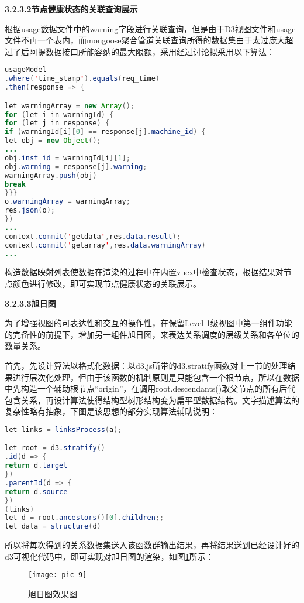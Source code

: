 {\textbf{3.2.3.2\quad 节点健康状态的关联查询展示}}

根据usage数据文件中的warning字段进行关联查询，但是由于D3视图文件和usage文件不再一个表内，而mongoose聚合管道关联查询所得的数据集由于太过庞大超过了后阿提数据接口所能容纳的最大限额，采用经过讨论拟采用以下算法：

\begin{lstlisting}[caption=基于vuex对数据的集中式管理,frame=shadowbox,language={java}]
usageModel
.where('time_stamp').equals(req_time)
.then(response => {

let warningArray = new Array();
for (let i in warningId) {
for (let j in response) {
if (warningId[i][0] == response[j].machine_id) {
let obj = new Object();
...
obj.inst_id = warningId[i][1];
obj.warning = response[j].warning;
warningArray.push(obj)
break
}}}
o.warningArray = warningArray;
res.json(o);
})
...
context.commit('getdata',res.data.result);
context.commit('getarray',res.data.warningArray)
...
\end{lstlisting}

构造数据映射列表使数据在渲染的过程中在内置vuex中检查状态，根据结果对节点颜色进行修改，即可实现节点健康状态的关联展示。

{\textbf{3.2.3.3\quad 旭日图}}

为了增强视图的可表达性和交互的操作性，在保留Level-1级视图中第一组件功能的完备性的前提下，增加另一组件旭日图，来表达关系调度的层级关系和各单位的数量关系。

首先，先设计算法以格式化数据：以d3.js所带的d3.stratify函数对上一节的处理结果进行层次化处理，但由于该函数的机制原则是只能包含一个根节点，所以在数据中先构造一个辅助根节点“origin”，在调用root.descendants()取父节点的所有后代包含关系，再设计算法使得结构型树形结构变为扁平型数据结构。文字描述算法的复杂性略有抽象，下图是该思想的部分实现算法辅助说明：

\begin{lstlisting}[caption=构造父子节点结构数据,frame=shadowbox,language={java}]
let links = linksProcess(a);

let root = d3.stratify()
.id(d => {
return d.target
})
.parentId(d => {
return d.source
})
(links)
let d = root.ancestors()[0].children;;
let data = structure(d)
\end{lstlisting}

所以将每次得到的关系数据集送入该函数群输出结果，再将结果送到已经设计好的d3可视化代码中，即可实现对旭日图的渲染，如图\ref{pic-91}所示：

\begin{figure}[h]
	\centering
	\texttt{[image: pic-9]}
	\caption{旭日图效果图}
	\label{pic-91}
\end{figure}


